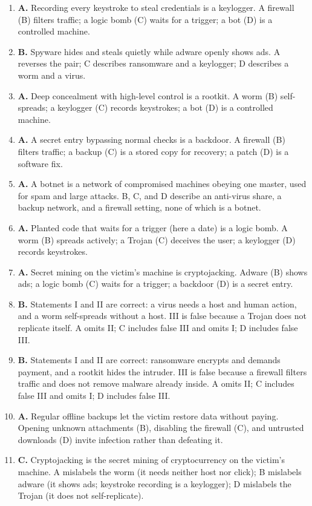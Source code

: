 \documentclass[11pt]{article}
\begin{document}
\begin{enumerate}[label=\textbf{Q\arabic*.}, leftmargin=*]
  Spyware (A) hides; a rootkit (C) conceals deeply; a backdoor (D) is a
  secret re-entry path.
\item \textbf{A.} Recording every keystroke to steal credentials is a
  keylogger. A firewall (B) filters traffic; a logic bomb (C) waits for a
  trigger; a bot (D) is a controlled machine.
\item \textbf{B.} Spyware hides and steals quietly while adware openly shows
  ads. A reverses the pair; C describes ransomware and a keylogger; D
  describes a worm and a virus.
\item \textbf{A.} Deep concealment with high-level control is a rootkit. A
  worm (B) self-spreads; a keylogger (C) records keystrokes; a bot (D) is a
  controlled machine.
\item \textbf{A.} A secret entry bypassing normal checks is a backdoor. A
  firewall (B) filters traffic; a backup (C) is a stored copy for recovery;
  a patch (D) is a software fix.
\item \textbf{A.} A botnet is a network of compromised machines obeying one
  master, used for spam and large attacks. B, C, and D describe an
  anti-virus share, a backup network, and a firewall setting, none of which
  is a botnet.
\item \textbf{A.} Planted code that waits for a trigger (here a date) is a
  logic bomb. A worm (B) spreads actively; a Trojan (C) deceives the user;
  a keylogger (D) records keystrokes.
\item \textbf{A.} Secret mining on the victim's machine is cryptojacking.
  Adware (B) shows ads; a logic bomb (C) waits for a trigger; a backdoor
  (D) is a secret entry.
\item \textbf{B.} Statements I and II are correct: a virus needs a host and
  human action, and a worm self-spreads without a host. III is false because
  a Trojan does not replicate itself. A omits II; C includes false III and
  omits I; D includes false III.
\item \textbf{B.} Statements I and II are correct: ransomware encrypts and
  demands payment, and a rootkit hides the intruder. III is false because a
  firewall filters traffic and does not remove malware already inside. A
  omits II; C includes false III and omits I; D includes false III.
\item \textbf{A.} Regular offline backups let the victim restore data
  without paying. Opening unknown attachments (B), disabling the firewall
  (C), and untrusted downloads (D) invite infection rather than defeating
  it.
\item \textbf{C.} Cryptojacking is the secret mining of cryptocurrency on the
  victim's machine. A mislabels the worm (it needs neither host nor click);
  B mislabels adware (it shows ads; keystroke recording is a keylogger); D
  mislabels the Trojan (it does not self-replicate).


\end{enumerate}
\end{document}
